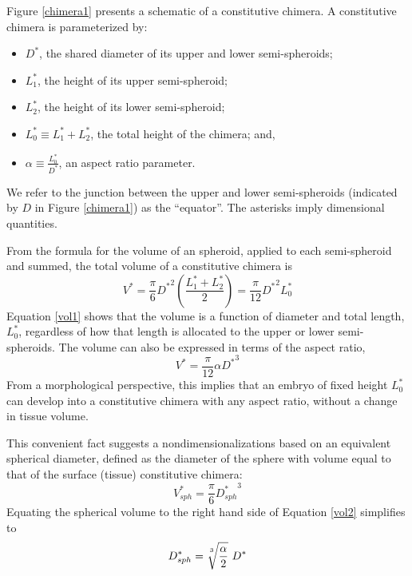 \documentclass[10pt,a4paper]{article}
\begin{document}
\noindent
Figure \ref{chimera1} presents a schematic of a constitutive chimera.
A constitutive chimera is parameterized by:
\begin{itemize}
	\item $D^*$, the shared diameter of its upper and lower semi-spheroids;
	\item $L_1^*$, the height of its upper semi-spheroid;
	\item $L_2^*$, the height of its  lower semi-spheroid; 
	\item $L_0^* \equiv L_1^* + L_2^*$, the total height of the chimera; and,
	\item $\alpha \equiv \frac{L_0^*}{D^*}$, an aspect ratio parameter.
\end{itemize}
We refer to the junction between the upper and lower semi-spheroids (indicated by $D$ in Figure \ref{chimera1}) as the ``equator''.
The asterisks imply dimensional quantities.

From the formula for the volume of an spheroid, applied to each semi-spheroid and summed, the total volume of a constitutive chimera is
\begin{equation}\label{vol1}
	V^* = \frac{\pi}{6} {D^*}^2 \left(\frac{L_1^*+L_2^*}{2}\right) = \frac{\pi}{12} {D^*}^2 L_0^*
\end{equation} 
Equation \ref{vol1} shows that the volume is a function of diameter and total length, $L_0^*$, regardless of how that length is allocated to the upper or lower semi-spheroids.
The volume can also be expressed in terms of the aspect ratio,
\begin{equation}\label{vol2}
	V^* = \frac{\pi}{12} \alpha {D^*}^3
\end{equation} 
From a morphological perspective, this implies that an embryo of fixed height $L_0^*$ can develop into a constitutive chimera with any aspect ratio, without a change in tissue volume. 

This convenient fact suggests a nondimensionalizations based on an equivalent spherical diameter, defined as the diameter of the sphere with volume equal to that of the surface (tissue) constitutive chimera:
\begin{equation}\label{equivsphere}
	V_{sph}^* = \frac{\pi}{6} {D_{sph}^*}^3
\end{equation} 
Equating the spherical volume to the right hand side of Equation \ref{vol2} simplifies to
\begin{equation}\label{equivD}
	D_{sph}^* = \sqrt[\uproot{5}3]{\frac{\alpha}{2}} ~ D^*
\end{equation} 
\end{document}
